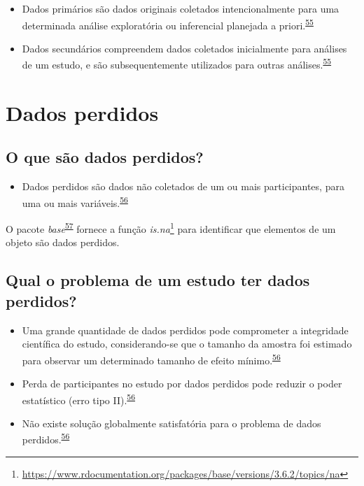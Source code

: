 \documentclass[
  a4paper,
]{book}
\providecommand{\tightlist}{%
  \setlength{\itemsep}{0pt}\setlength{\parskip}{0pt}}
\renewcommand{\href}[2]{#2\footnote{\url{#1}}}
\newenvironment{infobox}[1]
  {
  \begin{itemize}
  \renewcommand{\labelitemi}{
    \raisebox{-.7\height}[0pt][0pt]{
      {\setkeys{Gin}{width=3em,keepaspectratio}
        \texttt{[image: \#1]}}
    }
  }
  \setlength{\fboxsep}{1em}
  \begin{blackbox}
  \item
  }
  {
  \end{blackbox}
  \end{itemize}
  }
\begin{document}
\begin{itemize}
\item
  Dados primários são dados originais coletados intencionalmente para uma determinada análise exploratória ou inferencial planejada a priori.\textsuperscript{\protect\hyperlink{ref-vetter2017}{55}}
\item
  Dados secundários compreendem dados coletados inicialmente para análises de um estudo, e são subsequentemente utilizados para outras análises.\textsuperscript{\protect\hyperlink{ref-vetter2017}{55}}
\end{itemize}

\hypertarget{dados-perdidos}{%
\section{Dados perdidos}\label{dados-perdidos}}

\hypertarget{o-que-suxe3o-dados-perdidos}{%
\subsection{O que são dados perdidos?}\label{o-que-suxe3o-dados-perdidos}}

\begin{itemize}
\tightlist
\item
  Dados perdidos são dados não coletados de um ou mais participantes, para uma ou mais variáveis.\textsuperscript{\protect\hyperlink{ref-Altman2007}{56}}
\end{itemize}

\begin{infobox}{images/Rlogo}
O pacote \emph{base}\textsuperscript{\protect\hyperlink{ref-base-2}{57}} fornece a função \href{https://www.rdocumentation.org/packages/base/versions/3.6.2/topics/na}{\emph{is.na}} para identificar que elementos de um objeto são dados perdidos.

\end{infobox}

\hypertarget{qual-o-problema-de-um-estudo-ter-dados-perdidos}{%
\subsection{Qual o problema de um estudo ter dados perdidos?}\label{qual-o-problema-de-um-estudo-ter-dados-perdidos}}

\begin{itemize}
\item
  Uma grande quantidade de dados perdidos pode comprometer a integridade científica do estudo, considerando-se que o tamanho da amostra foi estimado para observar um determinado tamanho de efeito mínimo.\textsuperscript{\protect\hyperlink{ref-Altman2007}{56}}
\item
  Perda de participantes no estudo por dados perdidos pode reduzir o poder estatístico (erro tipo II).\textsuperscript{\protect\hyperlink{ref-Altman2007}{56}}
\item
  Não existe solução globalmente satisfatória para o problema de dados perdidos.\textsuperscript{\protect\hyperlink{ref-Altman2007}{56}}
\end{itemize}
\end{document}
